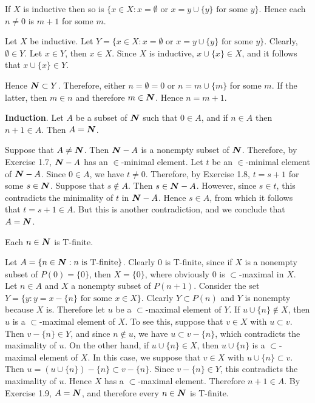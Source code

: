  If $X$ is inductive then so is
$\{ x \in X : x = \emptyset \text{ or } x = y 
\cup \{ y \} \text{ for some } y \}$. Hence each 
$n \neq 0$ is $m + 1$ for some $m$.
\begin{solution}
  Let $X$ be inductive. Let 
  $Y = \{ x \in X : x = \emptyset \text{ or } x = y 
  \cup \{ y \} \text{ for some } y \}$. Clearly, 
  $\emptyset \in Y$. Let $x \in Y$, then $x \in X$. Since $X$ is
  inductive, $x \cup \{ x \} \in X$, and it follows that 
  $x \cup \{ x \} \in Y$.

  Hence $\boldsymbol{N} \subset Y$. Therefore, either $n = \emptyset = 0$ or 
  $n = m \cup \{ m \}$ for some $m$. If the latter, then $m \in n$ and
  therefore $m \in \boldsymbol{N}$. Hence $n = m + 1$.
\end{solution}

 \textbf{Induction}. Let $A$ be a subset of $\boldsymbol{N}$ such that
$0 \in A$, and if $n \in A$ then $n + 1 \in A$. Then $A = \boldsymbol{N}$.
\begin{solution}
  Suppose that $A \neq \boldsymbol{N}$. Then $\boldsymbol{N} - A$ is a nonempty subset of
  $\boldsymbol{N}$. Therefore, by Exercise 1.7, $\boldsymbol{N} - A$ has an $\in$-minimal
  element. Let $t$ be an $\in$-minimal element of $\boldsymbol{N} - A$. Since 
  $0 \in A$, we have $t \neq 0$. Therefore, by Exercise 1.8, 
  $t = s + 1$ for some $s \in \boldsymbol{N}$. Suppose that $s \notin A$. Then 
  $s \in \boldsymbol{N} - A$. However, since $s \in t$, this contradicts the
  minimality of $t$ in $\boldsymbol{N} - A$. Hence $s \in A$, from which it follows
  that $t = s + 1 \in A$. But this is another contradiction, and we
  conclude that $A = \boldsymbol{N}$.
\end{solution}

 Each $n \in \boldsymbol{N}$ is T-finite.
\begin{solution}
  Let $A = \{ n \in \boldsymbol{N} : n \text{ is T-finite} \}$. Clearly $0$ is
  T-finite, since if $X$ is a nonempty subset of $P(0) = \{ 0 \}$, then 
  $X = \{ 0 \}$, where obviously $0$ is $\subset$-maximal in $X$. Let 
  $n \in A$ and $X$ a nonempty subset of $P(n + 1)$. Consider the set 
  $Y = \{ y : y = x - \{ n \} \text{ for some } x \in X \}$. Clearly 
  $Y \subset P(n)$ and $Y$ is nonempty because $X$ is. Therefore let $u$ be
  a $\subset$-maximal element of $Y$. If $u \cup \{ n \} \notin X$, then
  $u$ is a $\subset$-maximal element of $X$. To see this, suppose that 
  $v \in X$ with $u \subset v$. Then $v - \{ n \} \in Y$, and since 
  $n \notin u$, we have $u \subset v - \{ n \}$, which contradicts the
  maximality of $u$. On the other hand, if $u \cup \{ n \} \in X$, then 
  $u \cup \{ n \}$ is a $\subset$-maximal element of $X$. In this case, we
  suppose that $v \in X$ with $u \cup \{ n \} \subset v$. Then 
  $u = (u \cup \{ n \}) - \{ n \} \subset v - \{ n \}$. Since 
  $v - \{ n \} \in Y$, this contradicts the maximality of $u$. Hence 
  $X$ has a $\subset$-maximal element. Therefore $n + 1 \in A$. By Exercise
  1.9, $A = \boldsymbol{N}$, and therefore every $n \in \boldsymbol{N}$ is T-finite.
\end{solution}
